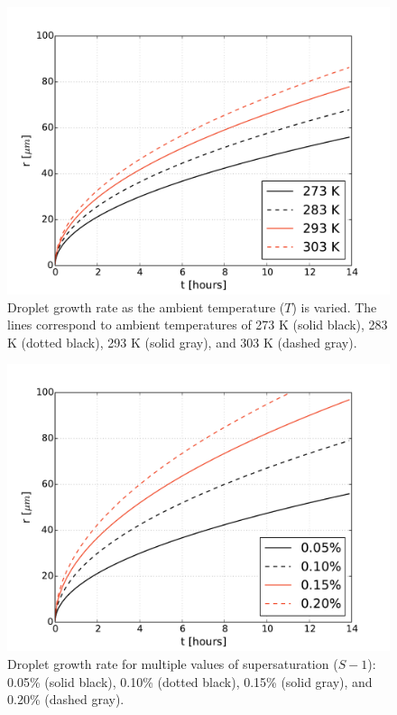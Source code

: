 \documentclass[]{article}
\begin{document}
\begin{figure}
    \centering
    \includegraphics[width=\textwidth]{r_t_temperature.pdf}
    \caption{Droplet growth rate as the ambient temperature ($T$) is varied. The lines correspond to ambient temperatures of 273 K (solid black), 283 K (dotted black), 293 K (solid gray), and 303 K (dashed gray).}
    \label{fig:temperature}
\end{figure}


\begin{figure}
    \centering
    \includegraphics[width=\textwidth]{r_t_supersaturation.pdf}
    \caption{Droplet growth rate for multiple values of supersaturation ($S - 1$): 0.05\% (solid black), 0.10\% (dotted black), 0.15\% (solid gray), and 0.20\% (dashed gray).}
    \label{fig:supersaturation}
\end{figure}
\end{document}
